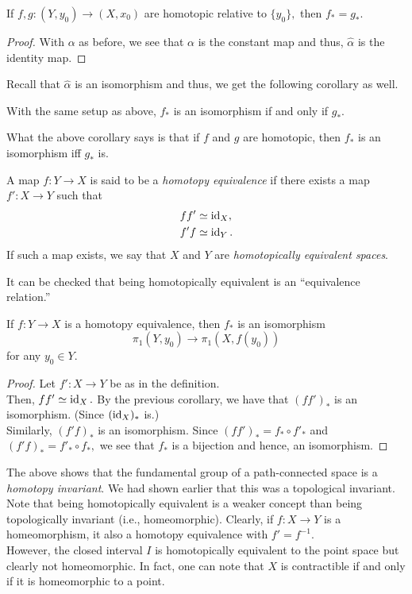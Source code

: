 \documentclass[12pt]{article}
\begin{document}
\begin{cor} \label{cor:homsamehomo}
	If $f, g: (Y, y_0) \to (X, x_0)$ are homotopic relative to $\{y_0\},$ then $f_* = g_*.$
\end{cor}
\begin{proof} 
	With $\alpha$ as before, we see that $\alpha$ is the constant map and thus, $\widehat{\alpha}$ is the identity map.
\end{proof}

Recall that $\widehat{\alpha}$ is an isomorphism and thus, we get the following corollary as well.
\begin{cor} \label{cor:homsameiso}
	With the same setup as above, $f_*$ is an isomorphism if and only if $g_*.$
\end{cor}
What the above corollary says is that if $f$ and $g$ are homotopic, then $f_*$ is an isomorphism iff $g_*$ is.

\begin{defn}
	A map $f:Y \to X$ is said to be a \emph{homotopy equivalence} if there exists a map $f':X \to Y$ such that
	\begin{align*} 
		ff' & \simeq \operatorname{id}_X,\\
		f'f & \simeq \operatorname{id}_Y.
	\end{align*}
	If such a map exists, we say that $X$ and $Y$ are \emph{homotopically equivalent spaces}.
\end{defn}
It can be checked that being homotopically equivalent is an ``equivalence relation.''

\begin{cor}
	If $f:Y \to X$ is a homotopy equivalence, then $f_*$ is an isomorphism
	\begin{equation*} 
		\pi_1(Y, y_0) \to \pi_1(X, f(y_0))
	\end{equation*}	
	for any $y_0 \in Y.$
\end{cor}
\begin{proof} 
	Let $f':X \to Y$ be as in the definition.\\
	Then, $ff' \simeq \operatorname{id}_X.$ By the previous corollary, we have that $(ff')_*$ is an isomorphism. (Since $(\operatorname{id}_X)_*$ is.)\\
	Similarly, $(f'f)_*$ is an isomorphism. Since $(ff')_* = f_*\circ f'_*$ and $(f'f)_* = f'_* \circ f_*,$ we see that $f_*$ is a bijection and hence, an isomorphism.
\end{proof}

The above shows that the fundamental group of a path-connected space is a \emph{homotopy invariant}. We had shown earlier that this was a topological invariant. \\
Note that being homotopically equivalent is a weaker concept than being topologically invariant (i.e., homeomorphic). Clearly, if $f:X \to Y$ is a homeomorphism, it also a homotopy equivalence with $f' = f^{-1}.$\\
However, the closed interval $I$ is homotopically equivalent to the point space but clearly not homeomorphic. In fact, one can note that $X$ is contractible if and only if it is homeomorphic to a point.
%
%
\end{document}
